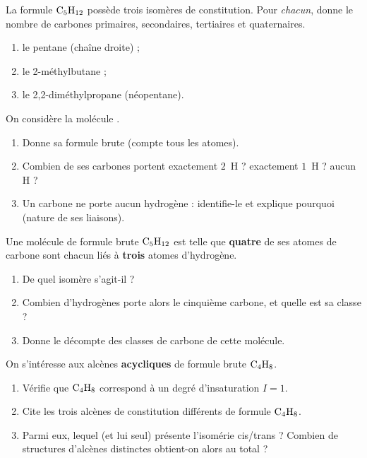 \documentclass[11pt,a4paper]{article}
\begin{document}
\begin{exo}
La formule $\ce{C5H12}$ possède trois isomères de constitution. Pour \emph{chacun}, donne le nombre de carbones primaires, secondaires, tertiaires et quaternaires.
\begin{enumerate}[label=\alph*)]
  \item le pentane (chaîne droite) ;
  \item le 2-méthylbutane ;
  \item le 2,2-diméthylpropane (néopentane).
\end{enumerate}
\end{exo}

\begin{exo}
On considère la molécule .
\begin{enumerate}[label=\alph*)]
  \item Donne sa formule brute (compte tous les atomes).
  \item Combien de ses carbones portent exactement $2$~H ? exactement $1$~H ? aucun H ?
  \item Un carbone ne porte aucun hydrogène : identifie-le et explique pourquoi (nature de ses liaisons).
\end{enumerate}
\end{exo}

\begin{exo}
Une molécule de formule brute $\ce{C5H12}$ est telle que \textbf{quatre} de ses atomes de carbone sont chacun liés à \textbf{trois} atomes d'hydrogène.
\begin{enumerate}[label=\alph*)]
  \item De quel isomère s'agit-il ?
  \item Combien d'hydrogènes porte alors le cinquième carbone, et quelle est sa classe ?
  \item Donne le décompte des classes de carbone de cette molécule.
\end{enumerate}
\end{exo}

\begin{exo}
On s'intéresse aux alcènes \textbf{acycliques} de formule brute $\ce{C4H8}$.
\begin{enumerate}[label=\alph*)]
  \item Vérifie que $\ce{C4H8}$ correspond à un degré d'insaturation $I=1$.
  \item Cite les trois alcènes de constitution différents de formule $\ce{C4H8}$.
  \item Parmi eux, lequel (et lui seul) présente l'isomérie cis/trans ? Combien de structures d'alcènes distinctes obtient-on alors au total ?
\end{enumerate}
\end{exo}
\end{document}
